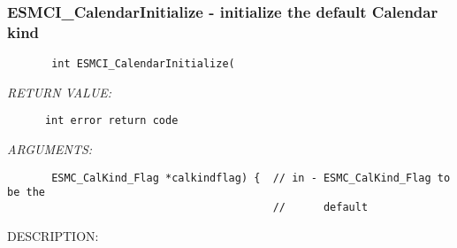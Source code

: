  
\setlength{\oldparskip}{\parskip}
\setlength{\parskip}{1.5ex}
\setlength{\oldparindent}{\parindent}
\setlength{\parindent}{0pt}
\setlength{\oldbaselineskip}{\baselineskip}
\setlength{\baselineskip}{11pt}
 
\def\bv{\begin{verbatim}}
\def\ev{\end{verbatim}}
\def\be{\begin{equation}}
\def\ee{\end{equation}}
\def\bea{\begin{eqnarray}}
\def\eea{\end{eqnarray}}
\def\bi{\begin{itemize}}
\def\ei{\end{itemize}}
\def\bn{\begin{enumerate}}
\def\en{\end{enumerate}}
\def\bd{\begin{description}}
\def\ed{\end{description}}
\def\({\left (}
\def\){\right )}
\def\[{\left [}
\def\]{\right ]}
\def\<{\left  \langle}
\def\>{\right \rangle}
\def\cI{{\cal I}}
\def\diag{\mathop{\rm diag}}
\def\tr{\mathop{\rm tr}}


 
\subsubsection [ESMCI\_CalendarInitialize] {ESMCI\_CalendarInitialize - initialize the default Calendar kind}


  
\begin{verbatim}       int ESMCI_CalendarInitialize(\end{verbatim}{\em RETURN VALUE:}
\begin{verbatim}      int error return code\end{verbatim}{\em ARGUMENTS:}
\begin{verbatim}       ESMC_CalKind_Flag *calkindflag) {  // in - ESMC_CalKind_Flag to be the
                                          //      default\end{verbatim}
{\sf DESCRIPTION:\\ }


